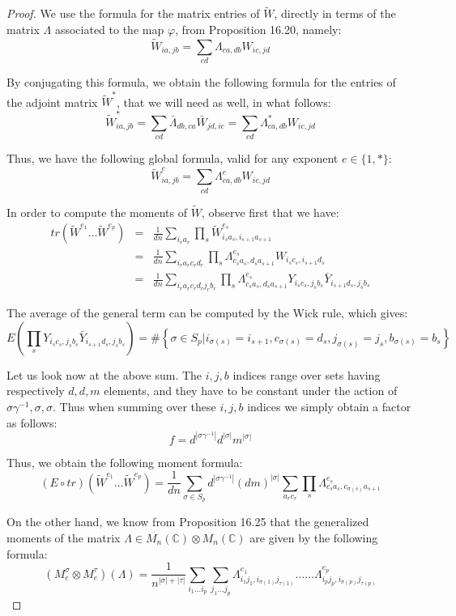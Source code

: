 \documentclass[12pt]{amsbook}
\begin{document}
\begin{proof}
We use the formula for the matrix entries of $\widetilde{W}$, directly in terms of the matrix $\Lambda$ associated to the map $\varphi$, from Proposition 16.20, namely:
$$\widetilde{W}_{ia,jb}=\sum_{cd}\Lambda_{ca,db}W_{ic,jd}$$

By conjugating this formula, we obtain the following formula for the entries of the adjoint matrix $\widetilde{W}^*$, that we will need as well, in what follows:
$$\widetilde{W}_{ia,jb}^*
=\sum_{cd}\bar{\Lambda}_{db,ca}\bar{W}_{jd,ic}
=\sum_{cd}\Lambda^*_{ca,db}W_{ic,jd}$$

Thus, we have the following global formula, valid for any exponent $e\in\{1,*\}$:
$$\widetilde{W}_{ia,jb}^e=\sum_{cd}\Lambda^e_{ca,db}W_{ic,jd}$$

In order to compute the moments of $\widetilde{W}$, observe first that we have:
\begin{eqnarray*}
tr(\widetilde{W}^{e_1}\ldots\widetilde{W}^{e_p})
&=&\frac{1}{dn}\sum_{i_ra_r}\prod_s\widetilde{W}_{i_sa_s,i_{s+1}a_{s+1}}^{e_s}\\
&=&\frac{1}{dn}\sum_{i_ra_rc_rd_r}\prod_s\Lambda_{c_sa_s,d_sa_{s+1}}^{e_s}W_{i_sc_s,i_{s+1}d_s}\\
&=&\frac{1}{dn}\sum_{i_ra_rc_rd_rj_rb_r}\prod_s\Lambda_{c_sa_s,d_sa_{s+1}}^{e_s}Y_{i_sc_s,j_sb_s}\bar{Y}_{i_{s+1}d_s,j_sb_s}
\end{eqnarray*}

The average of the general term can be computed by the Wick rule, which gives:
$$E\left(\prod_sY_{i_sc_s,j_sb_s}\bar{Y}_{i_{s+1}d_s,j_sb_s}\right)
=\#\left\{\sigma\in S_p\Big|i_{\sigma(s)}=i_{s+1},c_{\sigma(s)}=d_s,j_{\sigma(s)}=j_s,b_{\sigma(s)}=b_s\right\}$$

Let us look now at the above sum. The $i,j,b$ indices range over sets having respectively $d,d,m$ elements, and they have to be constant under the action of $\sigma\gamma^{-1},\sigma,\sigma$. Thus when summing over these $i,j,b$ indices we simply obtain a factor as follows:
$$f=d^{|\sigma\gamma^{-1}|}d^{|\sigma|}m^{|\sigma|}$$

Thus, we obtain the following moment formula:
$$(E\circ tr)(\widetilde{W}^{e_1}\ldots\widetilde{W}^{e_p})
=\frac{1}{dn}\sum_{\sigma\in S_p}d^{|\sigma\gamma^{-1}|}(dm)^{|\sigma|}\sum_{a_rc_r}\prod_s\Lambda_{c_sa_s,c_{\sigma(s)}a_{s+1}}^{e_s}$$

On the other hand, we know from Proposition 16.25 that the generalized moments of the matrix $\Lambda\in M_n(\mathbb C)\otimes M_n(\mathbb C)$ are given by the following formula:
$$(M^\sigma_e\otimes M^\tau_e)(\Lambda)=\frac{1}{n^{|\sigma|+|\tau|}}\sum_{i_1\ldots i_p}\sum_{j_1\ldots j_p}\Lambda_{i_1j_1,i_{\sigma(1)}j_{\tau(1)}}^{e_1}\ldots\ldots\Lambda_{i_pj_p,i_{\sigma(p)}j_{\tau(p)}}^{e_p}$$


\end{proof}
\end{document}
